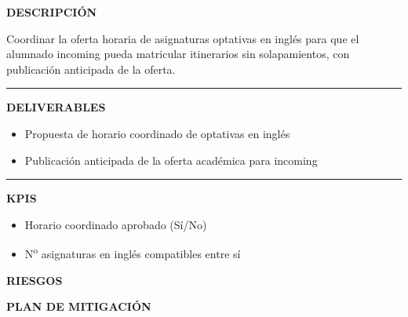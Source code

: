 \documentclass[11pt,a4paper]{scrreprt}
\newcommand{\fieldlabel}[1]{%
  {\footnotesize\sffamily\bfseries\color{mutedcolor}\MakeUppercase{#1}}\par\nopagebreak[4]
}
\newcommand{\fieldsep}{\vspace{3pt}\noindent\textcolor{bordercolor}{\rule{\linewidth}{0.4pt}}\vspace{3pt}\par}
\begin{document}
\begin{tcolorbox}[pabox={fgcolor}{PA3.1 \enspace\textbullet\enspace Asignar horario coordinado para optativas en inglés}]

\fieldlabel{Descripci\'on}
{\small Coordinar la oferta horaria de asignaturas optativas en inglés para que el alumnado incoming pueda matricular itinerarios sin solapamientos, con publicación anticipada de la oferta.}\par
\fieldsep
\fieldlabel{Deliverables}
{\small \begin{itemize}[noitemsep,topsep=2pt]
\item Propuesta de horario coordinado de optativas en inglés
\item Publicación anticipada de la oferta académica para incoming
\end{itemize}}\par
\fieldsep
\fieldlabel{KPIs}
{\small \begin{itemize}[noitemsep,topsep=2pt]
\item Horario coordinado aprobado (Sí/No)
\item N\textsuperscript{o} asignaturas en inglés compatibles entre sí
\end{itemize}}\par
\end{tcolorbox}
\begin{tcolorbox}[riskbox]
{\footnotesize\sffamily\bfseries\color{red!50!black} RIESGOS}\par{}
\end{tcolorbox}
\begin{tcolorbox}[mitbox]
{\footnotesize\sffamily\bfseries\color{green!40!black} PLAN DE MITIGACI\'ON}\par{}
\end{tcolorbox}
\vspace{8pt}
\end{document}
